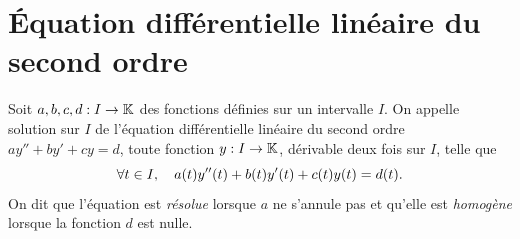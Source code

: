 \documentclass{magnolia}
\begin{document}



\section{Équation différentielle linéaire du second ordre}

\begin{definition}
Soit $a,b,c,d:I\to\mathbb{K}$ des fonctions définies sur un intervalle $I$. On appelle solution sur $I$ de l'équation différentielle linéaire du second ordre $ay''+by'+cy=d$, toute fonction $y:I\to\mathbb{K}$, dérivable deux fois sur $I$, telle que
\[\forall t\in I ,\quad a(t)y''(t)+b(t)y'(t)+c(t)y(t)=d(t).\]
On dit que l'équation est \emph{résolue} lorsque $a$ ne s'annule pas et qu'elle est \emph{homogène} lorsque la fonction $d$ est nulle.
\end{definition}
\end{document}
